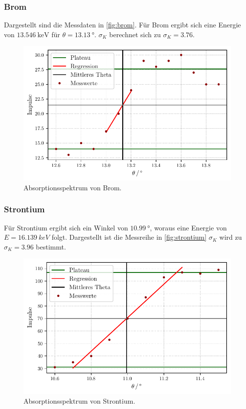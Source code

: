\subsubsection{Brom}
Dargestellt sind die Messdaten in \autoref{fig:brom}.
Für Brom ergibt sich eine Energie von $\qty{13.546}{\keV}$ für $\theta = \qty{13.13}{°}$.
$\sigma_K$ berechnet sich zu $\sigma_K = 3.76$.
\begin{figure} [H]
  \centering
  \includegraphics[width=0.5 \linewidth]{build/brom.pdf}
  \caption{Absorptionsspektrum von Brom.}
  \label{fig:brom}
\end{figure}


\subsubsection{Strontium}
Für Strontium ergibt sich ein Winkel von $\qty{10.99}{°}$, woraus eine Energie von $E = \qty{16.139}{keV}$ folgt.
Dargestellt ist die Messreihe in \autoref{fig:strontium}
$\sigma_K$ wird zu $\sigma_K = 3.96$ bestimmt.
\begin{figure}[H]
  \centering
  \includegraphics[width=0.5 \linewidth]{build/strontium.pdf}
  \caption{Absorptionsspektrum von Strontium.}
  \label{fig:strontium}
\end{figure}

